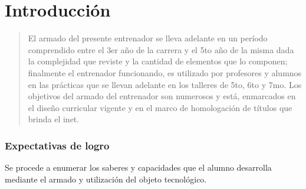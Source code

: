 \part{Introducción}%
\begin{abstract}
	El armado del presente entrenador se lleva adelante en un período comprendido entre el 3er año de la carrera y el 5to año de la misma dada la complejidad que reviste y la cantidad de elementos que lo componen; finalmente el entrenador funcionando, es utilizado por profesores y alumnos en las prácticas que se llevan adelante en los talleres de 5to, 6to y 7mo.
	Los objetivos del armado del entrenador son numerosos y está, enmarcados en el diseño curricular vigente y en el marco de homologación de títulos que brinda el inet.
\end{abstract}
\section{Expectativas de logro}
Se procede a enumerar los saberes y capacidades que el alumno desarrolla mediante el armado y utilización del objeto tecnológico.

